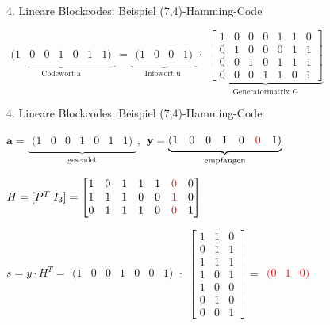 \documentclass[ngerman]{beamer}
\begin{document}
\begin{frame}{4. Lineare Blockcodes: Beispiel (7,4)-Hamming-Code}

$ \underbrace{\begin{matrix} (1&0&0&1&0&1&1)\end{matrix}}_\text{Codewort a} = \underbrace{\begin{matrix} (1 & 0 &0&1)\end{matrix}}_\text{Infowort u }	\cdot $
$
\underbrace{\begin{bmatrix}
1 & 0 & 0 & 0 &  1 & 1 & 0 \\
0 & 1 & 0 & 0 &  0 & 1 & 1 \\
0 & 0 & 1 & 0 &  1 & 1 & 1 \\
0 & 0 & 0 & 1 &  1 & 0 & 1
\end{bmatrix}}_\text{Generatormatrix G}
$


\end{frame}


\begin{frame}{4. Lineare Blockcodes: Beispiel (7,4)-Hamming-Code}

$
\textbf{a} = \underbrace{\begin{matrix} (1 & 0 & 0 & 1 & 0 & 1 & 1)\end{matrix}}_\text{gesendet},$
$\textbf{y} = \underbrace{\begin{matrix} (1 & 0 & 0 & 1 & 0 & \begingroup\color{red} 0\endgroup & 1)\end{matrix}}_\text{empfangen}$



$
H = [P^{T} | I_{3}] =
\begin{bmatrix}
1 & 0 & 1 & 1 & 1 & \begingroup\color{red}0\endgroup & 0 \\
1 & 1 & 1 & 0 & 0 & \begingroup\color{red}1\endgroup & 0 \\
0 & 1 & 1 & 1 & 0 & \begingroup\color{red}0\endgroup & 1
\end{bmatrix}
$

$
s = y \cdot H^{T} = \begin{matrix} (1 & 0 & 0 & 1 & 0 & 0 & 1)\end{matrix} \cdot
$
$
\begin{bmatrix}
1 & 1 & 0  \\
0 & 1 & 1  \\
1 & 1 & 1 \\
1 & 0 & 1 \\
1 & 0 & 0 \\
0 & 1 & 0 \\
0 & 0 & 1
\end{bmatrix}
$
= \textcolor{red}{$  \begin{matrix}(0 & 1 & 0) \end{matrix}$}


\end{frame}
\end{document}
